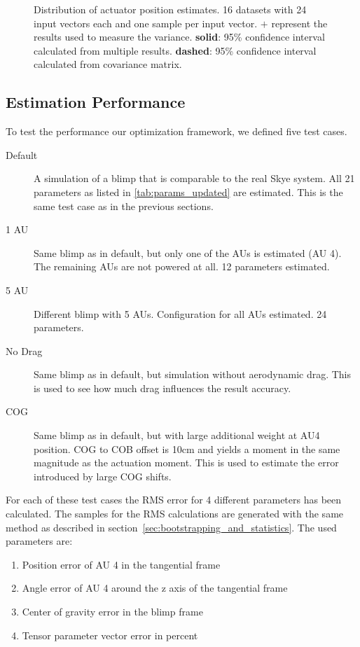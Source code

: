 \begin{figure}[hbtp]
\caption{Distribution of actuator position estimates. 16 datasets with 24 input vectors each and one sample per input vector.
$\mathbf{+}$ represent the results used to measure the variance.
\textbf{solid}: 95\% confidence interval calculated from multiple results. 
\textbf{dashed}: 95\% confidence interval calculated from covariance matrix.}
\label{fig:result_95pc_confidence}
\end{figure}

\subsection{Estimation Performance}
To test the performance our optimization framework, we defined five test cases.
\begin{description}
\item[Default] A simulation of a blimp that is comparable to the real Skye system. All 21 parameters as listed in \cref{tab:params_updated} are estimated. This is the same test case as in the previous sections.
\item[1 AU] Same blimp as in default, but only one of the AUs is estimated (AU 4). The remaining AUs are not powered at all. 12 parameters estimated.
\item[5 AU] Different blimp with 5 AUs. Configuration for all AUs estimated. 24 parameters.
\item[No Drag] Same blimp as in default, but simulation without aerodynamic drag. This is used to see how much drag influences the result accuracy.
\item[COG] Same blimp as in default, but with large additional weight at AU4 position. COG to COB offset is 10cm and yields a moment in the same magnitude as the actuation moment. This is used to estimate the error introduced by large COG shifts.
\end{description}

For each of these test cases the RMS error for 4 different parameters has been calculated.
The samples for the RMS calculations are generated with the same method as described in section~\ref{sec:bootstrapping_and_statistics}.
The used parameters are:
\begin{enumerate}
\item Position error of AU 4 in the tangential frame
\item Angle error of AU 4 around the z axis of the tangential frame
\item Center of gravity error in the blimp frame
\item Tensor parameter vector error in percent
\end{enumerate}


